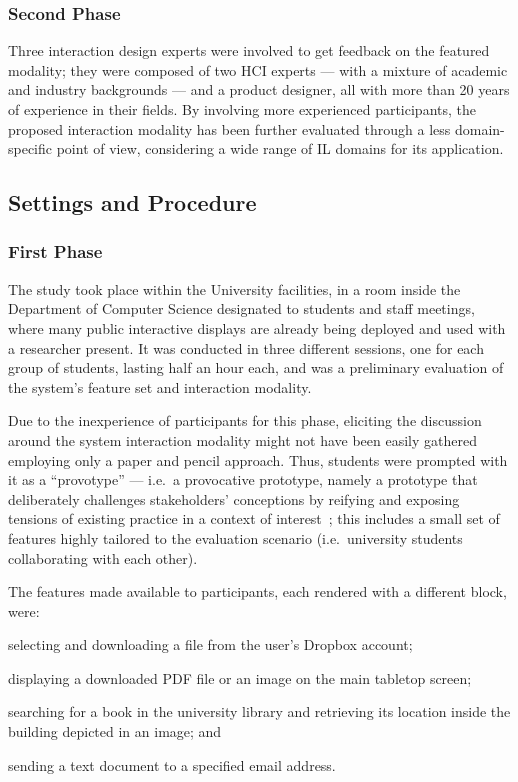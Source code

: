 \subsubsection{Second Phase}
Three interaction design experts were involved to get feedback on the featured modality; they were composed of two HCI experts --- with a mixture of academic and industry backgrounds --- and a product designer, all with more than 20 years of experience in their fields. By involving more experienced participants, the proposed interaction modality has been further evaluated through a less domain-specific point of view, considering a wide range of \ac{IL} domains for its application.

\subsection{Settings and Procedure}
\subsubsection{First Phase}
The study took place within the University facilities, in a room inside the Department of Computer Science designated to students and staff meetings, where many public interactive displays are already being deployed and used with a researcher present. It was conducted in three different sessions, one for each group of students, lasting half an hour each, and was a preliminary evaluation of the system's feature set and interaction modality.

Due to the inexperience of participants for this phase, eliciting the discussion around the system interaction modality might not have been easily gathered employing only a paper and pencil approach. Thus, students were prompted with it as a ``provotype'' --- i.e.\ a provocative prototype, namely a prototype that deliberately challenges stakeholders' conceptions by reifying and exposing tensions of existing practice in a context of interest~\cite{Boer:2012ku}; this includes a small set of features highly tailored to the evaluation scenario (i.e.\ university students collaborating with each other).

The features made available to participants, each rendered with a different block, were:
\begin{enumerate*}[label={(\arabic*)}]
  \item selecting and downloading a file from the user's Dropbox account;
  \item displaying a downloaded PDF file or an image on the main tabletop screen;
  \item searching for a book in the university library and retrieving its location inside the building depicted in an image; and
  \item sending a text document to a specified email address.
\end{enumerate*}

